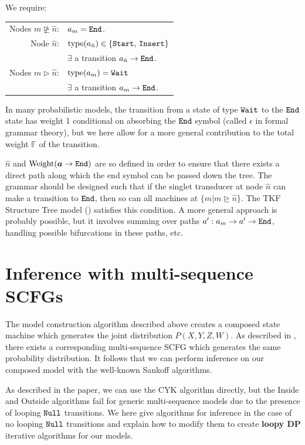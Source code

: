 \documentclass[10pt]{article}
\begin{document}
We require:

\begin{tabular}{rl}
  Nodes $m \ntrianglerighteq \hat{n}$: & $a_m = \mathtt{End}$. \\
  Node $\hat{n}$: & $\operatorname{type}(a_{\hat{n}}) \in \{\mathtt{Start},\,\mathtt{Insert}\}$ \\
  & $\exists$ a transition $a_{\hat{n}} \to \mathtt{End}$.  \\
  Nodes $m \vartriangleright \hat{n}$: & $\operatorname{type}(a_m) = \mathtt{Wait}$ \\
  & $\exists$ a transition $a_m \to \mathtt{End}$. \\
\end{tabular}

In many probabilistic models, the transition from a state of type $\mathtt{Wait}$ to the $\mathtt{End}$ state has weight 1 conditional on absorbing 
the $\mathtt{End}$ symbol (called $\epsilon$ in formal grammar theory),
but we here allow for a more general contribution to the total weight $\mathbb{F}$ of the transition.

$\hat{n}$ and $\operatorname{Weight}(\boldsymbol{a}\to\mathtt{End})$ are so defined in order to ensure that there exists a direct path
along which the end symbol can be passed down the tree.
The grammar should be designed such that if the singlet transducer at node $\hat{n}$ can make a transition to $\mathtt{End}$,
then so can all machines at $\{m|m \trianglerighteq \hat{n}\}$.
The TKF Structure Tree model () satisfies this condition.
A more general approach is probably possible, but it involves summing over paths $a': a_m \to a' \to \mathtt{End}$,
handling possible bifurcations in these paths, etc.


\newpage
\section{Inference with multi-sequence SCFGs}

The model construction algorithm described above creates a composed state machine
which generates the joint distribution $P(X, Y, Z, W)$.
As described in , there exists a corresponding multi-sequence SCFG
which generates the same probability distribution.
It follows that we can perform inference on our composed model with the well-known Sankoff
algorithms.

As described in the paper, we can use the CYK algorithm directly, but
the Inside and Outside algorithms fail for generic multi-sequence models
due to the presence of looping $\mathtt{Null}$ transitions.  We here give algorithms for inference 
in the case of no looping $\mathtt{Null}$ transitions and explain how to modify them to 
create {\bf loopy DP} iterative algorithms for our models.
\end{document}
